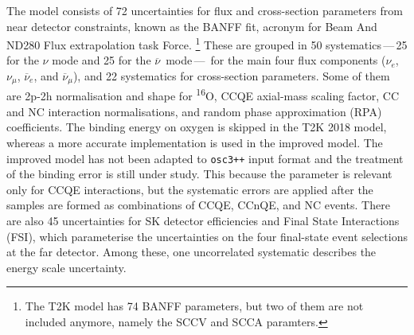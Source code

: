 \documentclass[a4paper, 11pt]{article}
\newcommand{\cj}{\overline}
\newcommand{\tapi}{\textsuperscript}
\begin{document}
The model consists of 72 uncertainties for flux and cross-section parameters from near detector constraints, %
known as the BANFF fit, acronym for Beam And ND280 Flux extrapolation task Force.%
\footnote{The T2K model has 74 BANFF parameters, but two of them are not included anymore, namely the SCCV and SCCA paramters.}
These are grouped in 50 systematics\,---\,25 for the $\nu$ mode and 25 for the $\cj{\nu}$~mode\,---\,%
for the main four flux components ($\nu_e$, $\nu_\mu$, $\cj{\nu}_e$, and $\cj{\nu}_\mu$), %
and 22 systematics for cross-section parameters.
Some of them are 2p-2h normalisation and shape for \tapi{16}O, CCQE axial-mass scaling factor, %
CC and NC interaction normalisations, and random phase approximation (RPA) coefficients.
The binding energy on oxygen is skipped in the T2K 2018 model, whereas a more accurate implementation is used in the improved model.
The improved model has not been adapted to \texttt{osc3++} input format and the treatment of the binding error is still under study.
This because the parameter is relevant only for CCQE interactions, but the systematic errors are applied %
after the samples are formed as combinations of CCQE, CCnQE, and NC events.
There are also 45 uncertainties for SK detector efficiencies and Final State Interactions (FSI),
which parameterise the uncertainties on the four final-state event selections at the far detector. %
Among these, one uncorrelated systematic describes the energy scale uncertainty.
\end{document}
